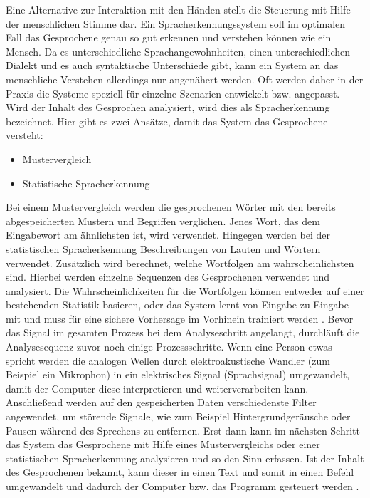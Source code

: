 Eine Alternative zur Interaktion mit den Händen stellt die Steuerung mit Hilfe der menschlichen Stimme dar. Ein Spracherkennungssystem soll im optimalen Fall das Gesprochene genau so gut erkennen und verstehen können wie ein Mensch. Da es unterschiedliche Sprachangewohnheiten, einen unterschiedlichen Dialekt und es auch syntaktische Unterschiede gibt, kann ein System an das menschliche Verstehen allerdings nur angenähert werden. Oft werden daher in der Praxis die Systeme speziell für einzelne Szenarien entwickelt bzw. angepasst. 
\newlinew \newline
Wird der Inhalt des Gesprochen analysiert, wird dies als Spracherkennung bezeichnet. Hier gibt es zwei Ansätze, damit das System das Gesprochene versteht:
\begin{itemize}
      \item Mustervergleich
      \item Statistische Spracherkennung
\end{itemize}
\vspace{\baselineskip}
Bei einem Mustervergleich werden die gesprochenen Wörter mit den bereits abgespeicherten Mustern und Begriffen verglichen. Jenes Wort, das dem Eingabewort am ähnlichsten ist, wird verwendet. Hingegen werden bei der statistischen Spracherkennung Beschreibungen von Lauten und Wörtern verwendet. Zusätzlich wird berechnet, welche Wortfolgen am wahrscheinlichsten sind. Hierbei werden einzelne Sequenzen des Gesprochenen verwendet und analysiert. Die Wahrscheinlichkeiten für die Wortfolgen können entweder auf einer bestehenden Statistik basieren, oder das System lernt von Eingabe zu Eingabe mit und muss für eine sichere Vorhersage im Vorhinein trainiert werden \cite{KaufmannPfisterSprache}. 
\newline \newline
Bevor das Signal im gesamten Prozess bei dem Analyseschritt angelangt, durchläuft die Analysesequenz zuvor noch einige Prozessschritte. Wenn eine Person etwas spricht werden die analogen Wellen durch elektroakustische Wandler (zum Beispiel ein Mikrophon) in ein elektrisches Signal (Sprachsignal) umgewandelt, damit der Computer diese interpretieren und weiterverarbeiten kann. Anschließend werden auf den gespeicherten Daten verschiedenste Filter angewendet, um störende Signale, wie zum Beispiel Hintergrundgeräusche oder Pausen während des Sprechens zu entfernen. Erst dann kann im nächsten Schritt das System das Gesprochene mit Hilfe eines Mustervergleichs oder einer statistischen Spracherkennung analysieren und so den Sinn erfassen. Ist der Inhalt des Gesprochenen bekannt, kann dieser in einen Text und somit in einen Befehl umgewandelt und dadurch der Computer bzw. das Programm gesteuert werden \cite{KaufmannPfisterSprache}.
